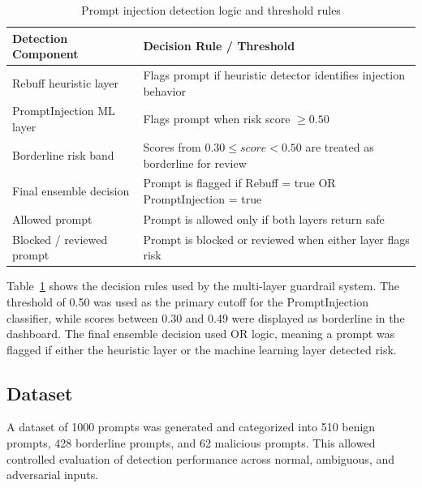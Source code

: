 \documentclass[10pt,leqno]{amsart}
\begin{document}
\begin{table}[h]
\centering
\caption{Prompt injection detection logic and threshold rules}
\label{tab:detection-logic}
\begin{tabular}{p{} p{}}
\hline
\textbf{Detection Component} & \textbf{Decision Rule / Threshold} \\
\hline
Rebuff heuristic layer & Flags prompt if heuristic detector identifies injection behavior \\
PromptInjection ML layer & Flags prompt when risk score $\geq 0.50$ \\
Borderline risk band & Scores from $0.30 \leq score < 0.50$ are treated as borderline for review \\
Final ensemble decision & Prompt is flagged if Rebuff = true OR PromptInjection = true \\
Allowed prompt & Prompt is allowed only if both layers return safe \\
Blocked / reviewed prompt & Prompt is blocked or reviewed when either layer flags risk \\
\hline
\end{tabular}
\end{table}

Table~\ref{tab:detection-logic} shows the decision rules used by the multi-layer guardrail system. The threshold of 0.50 was used as the primary cutoff for the PromptInjection classifier, while scores between 0.30 and 0.49 were displayed as borderline in the dashboard. The final ensemble decision used OR logic, meaning a prompt was flagged if either the heuristic layer or the machine learning layer detected risk.

\subsection{Dataset}

A dataset of 1000 prompts was generated and categorized into 510 benign prompts, 428 borderline prompts, and 62 malicious prompts. This allowed controlled evaluation of detection performance across normal, ambiguous, and adversarial inputs.
\end{document}
